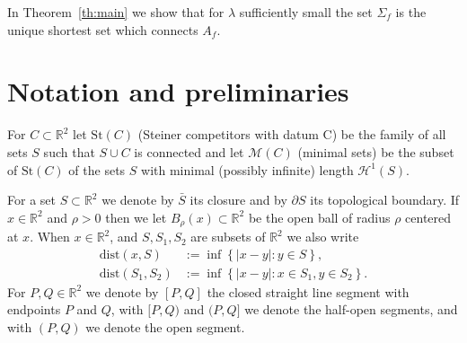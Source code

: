 \documentclass{amsart}
\newcommand{\RR}{\mathbb R}
\newcommand{\CC}{\mathbb C}
\newcommand{\NN}{\mathbb N}
\renewcommand{\H}{\mathcal H}
\newcommand{\abs}[1]{\left\vert #1 \right\vert}
\newcommand{\ENCLOSE}[1]{\left\{#1\right\}}
\newcommand{\St}{\mathrm{St}}
\newcommand{\M}{\mathcal{M}}
\renewcommand{\H}{\mathcal{H}}
\newcommand{\dist}{\mathrm{dist}}
\theoremstyle{definition}
\theoremstyle{remark}
\begin{document}
In Theorem~\ref{th:main} we show that for $\lambda$ sufficiently small the set $\Sigma_f$ 
is the unique shortest set which connects $A_f$.


% 
\section{Notation and preliminaries}

For $C\subset \RR^2$ let $\St(C)$ (Steiner competitors with datum C) be the family of all sets $S$ such that 
$S\cup C$ is connected and 
let $\M(C)$ (minimal sets) be the subset of $\St(C)$ of the sets $S$ 
with minimal (possibly infinite) length $\H^1(S)$.

For a set $S\subset \RR^2$ we denote by $\bar S$ 
its closure and by $\partial S$ its topological boundary.
If $x\in \RR^2$ and $\rho>0$ then we let $B_\rho(x)\subset \RR^2$ 
be the open ball of radius 
$\rho$ centered at $x$.
When $x\in \RR^2$, and $S,S_1,S_2$ are subsets of $\RR^2$
we also write
\begin{align*}
  \dist(x,S)
    &:=\inf\ENCLOSE{\abs{x-y}:y\in S},\\
  \dist(S_1,S_2) 
    &:= \inf\ENCLOSE{\abs{x-y}\colon x\in S_1, y\in S_2}.
\end{align*}
For $P,Q\in \RR^2$ we denote by $[P,Q]$ the closed straight line 
segment with endpoints $P$ and $Q$, with $[P,Q)$ and $(P,Q]$ 
we denote the half-open segments, and with $(P,Q)$ we denote 
the open segment.
\end{document}
